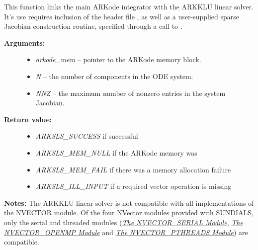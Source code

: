\documentclass[letterpaper,10pt,english]{sphinxmanual}
\begin{document}

\begin{fulllineitems}
\label{c_interface/User_callable:ARKKLU}
This function links the main ARKode integrator with the ARKKLU
linear solver.  It's use requires inclusion of the header file
, as well as a user-supplied sparse Jacobian
construction routine, specified through a call to
{\hyperref[c_interface/User_callable:ARKSlsSetSparseJacFn]{}}.
\begin{description}
\item[{\textbf{Arguments:}}] \leavevmode\begin{itemize}
\item {} 
\emph{arkode\_mem} -- pointer to the ARKode memory block.

\item {} 
\emph{N} -- the number of components in the ODE system.

\item {} 
\emph{NNZ} -- the maximum number of nonzero entries in the system
Jacobian.

\end{itemize}

\item[{\textbf{Return value:}}] \leavevmode\begin{itemize}
\item {} 
\emph{ARKSLS\_SUCCESS}   if successful

\item {} 
\emph{ARKSLS\_MEM\_NULL}  if the ARKode memory was 

\item {} 
\emph{ARKSLS\_MEM\_FAIL}  if there was a memory allocation failure

\item {} 
\emph{ARKSLS\_ILL\_INPUT} if a required vector operation is missing

\end{itemize}

\end{description}

\textbf{Notes:}  The ARKKLU linear solver is not compatible with
all implementations of the NVECTOR module.  Of the four NVector
modules provided with SUNDIALS, only the serial and threaded
modules ({\hyperref[nvectors/NVector_Serial:nvectors-nvserial]{\emph{The NVECTOR\_SERIAL Module}}}, {\hyperref[nvectors/NVector_OpenMP:nvectors-openmp]{\emph{The NVECTOR\_OPENMP Module}}} and
{\hyperref[nvectors/NVector_Pthreads:nvectors-pthreads]{\emph{The NVECTOR\_PTHREADS Module}}}) are compatible.

\end{fulllineitems}
\end{document}
